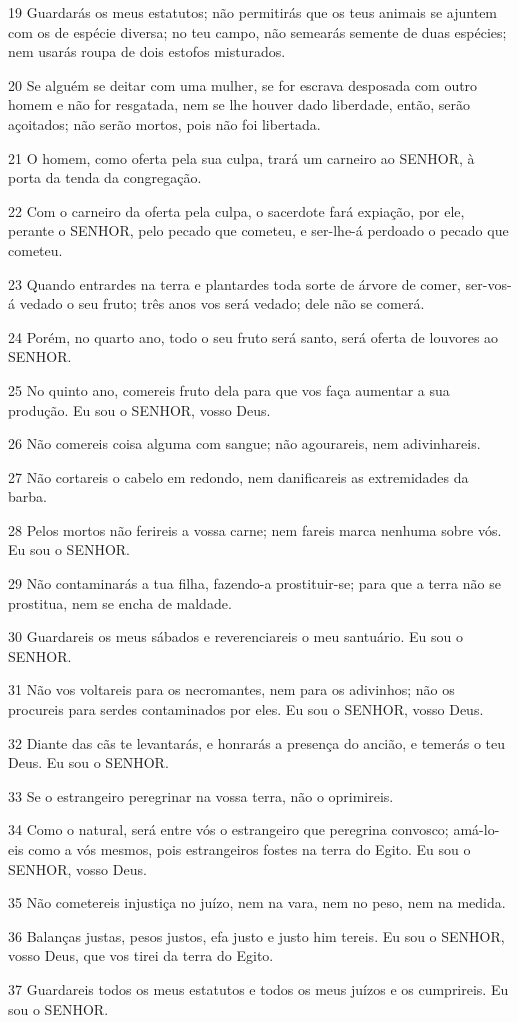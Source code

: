 \par 19 Guardarás os meus estatutos; não permitirás que os teus animais se ajuntem com os de espécie diversa; no teu campo, não semearás semente de duas espécies; nem usarás roupa de dois estofos misturados.
\par 20 Se alguém se deitar com uma mulher, se for escrava desposada com outro homem e não for resgatada, nem se lhe houver dado liberdade, então, serão açoitados; não serão mortos, pois não foi libertada.
\par 21 O homem, como oferta pela sua culpa, trará um carneiro ao SENHOR, à porta da tenda da congregação.
\par 22 Com o carneiro da oferta pela culpa, o sacerdote fará expiação, por ele, perante o SENHOR, pelo pecado que cometeu, e ser-lhe-á perdoado o pecado que cometeu.
\par 23 Quando entrardes na terra e plantardes toda sorte de árvore de comer, ser-vos-á vedado o seu fruto; três anos vos será vedado; dele não se comerá.
\par 24 Porém, no quarto ano, todo o seu fruto será santo, será oferta de louvores ao SENHOR.
\par 25 No quinto ano, comereis fruto dela para que vos faça aumentar a sua produção. Eu sou o SENHOR, vosso Deus.
\par 26 Não comereis coisa alguma com sangue; não agourareis, nem adivinhareis.
\par 27 Não cortareis o cabelo em redondo, nem danificareis as extremidades da barba.
\par 28 Pelos mortos não ferireis a vossa carne; nem fareis marca nenhuma sobre vós. Eu sou o SENHOR.
\par 29 Não contaminarás a tua filha, fazendo-a prostituir-se; para que a terra não se prostitua, nem se encha de maldade.
\par 30 Guardareis os meus sábados e reverenciareis o meu santuário. Eu sou o SENHOR.
\par 31 Não vos voltareis para os necromantes, nem para os adivinhos; não os procureis para serdes contaminados por eles. Eu sou o SENHOR, vosso Deus.
\par 32 Diante das cãs te levantarás, e honrarás a presença do ancião, e temerás o teu Deus. Eu sou o SENHOR.
\par 33 Se o estrangeiro peregrinar na vossa terra, não o oprimireis.
\par 34 Como o natural, será entre vós o estrangeiro que peregrina convosco; amá-lo-eis como a vós mesmos, pois estrangeiros fostes na terra do Egito. Eu sou o SENHOR, vosso Deus.
\par 35 Não cometereis injustiça no juízo, nem na vara, nem no peso, nem na medida.
\par 36 Balanças justas, pesos justos, efa justo e justo him tereis. Eu sou o SENHOR, vosso Deus, que vos tirei da terra do Egito.
\par 37 Guardareis todos os meus estatutos e todos os meus juízos e os cumprireis. Eu sou o SENHOR.


